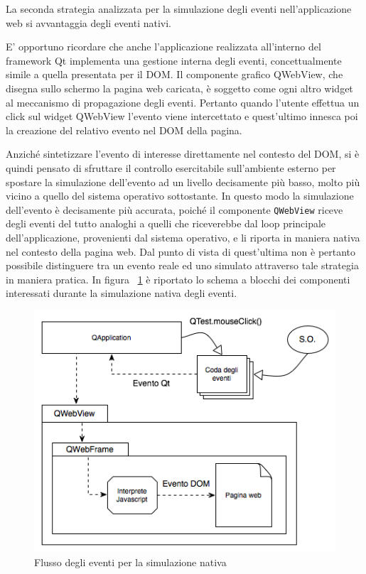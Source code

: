 \documentclass[12pt]{toptesi}
\begin{document}
La seconda strategia analizzata per la simulazione degli eventi nell'applicazione web si avvantaggia degli eventi nativi. 

E' opportuno ricordare che anche l'applicazione realizzata all'interno del framework Qt implementa una gestione interna degli eventi, concettualmente simile a quella presentata per il DOM. Il componente grafico QWebView, che disegna sullo schermo la pagina web caricata, è soggetto come ogni altro widget al meccanismo di propagazione degli eventi. Pertanto quando l'utente effettua un click sul widget QWebView l'evento viene intercettato e quest'ultimo innesca poi la creazione del relativo evento nel DOM della pagina. 

Anziché sintetizzare l'evento di interesse direttamente nel contesto del DOM, si è quindi pensato di sfruttare il controllo esercitabile sull'ambiente esterno per spostare la simulazione dell'evento ad un livello decisamente più basso, molto più vicino a quello del sistema operativo sottostante. In questo modo la simulazione dell'evento è decisamente più accurata, poiché il componente \verb|QWebView| riceve degli eventi del tutto analoghi a quelli che riceverebbe dal loop principale dell'applicazione, provenienti dal sistema operativo, e li riporta in maniera nativa nel contesto della pagina web. Dal punto di vista di quest'ultima non è pertanto possibile distinguere tra un evento reale ed uno simulato attraverso tale strategia in maniera pratica. In figura ~\ref{fig:nativeEvents} è riportato lo schema a blocchi dei componenti interessati durante la simulazione nativa degli eventi.

\begin{figure}[htbp]
\begin{center}
\includegraphics[width=\textwidth]{images/native_events.png}
\caption{Flusso degli eventi per la simulazione nativa}
\label{fig:nativeEvents}
\end{center}
\end{figure}
\end{document}
